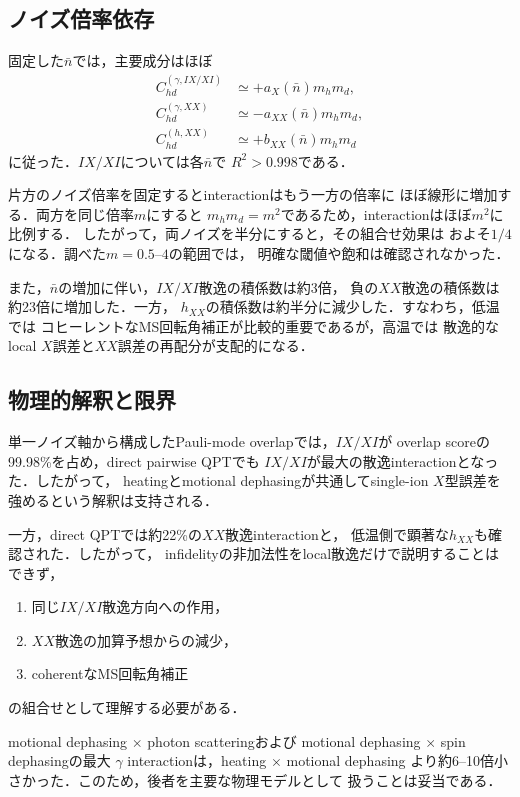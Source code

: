 \documentclass[dvipdfmx,a4paper,10pt,twocolumn]{jsarticle}
\begin{document}
\subsection{ノイズ倍率依存}

固定した$\bar n$では，主要成分はほぼ
\begin{align}
 C_{hd}^{(\gamma,IX/XI)}
 &\simeq +a_X(\bar n)m_hm_d,\\
 C_{hd}^{(\gamma,XX)}
 &\simeq -a_{XX}(\bar n)m_hm_d,\\
 C_{hd}^{(h,XX)}
 &\simeq +b_{XX}(\bar n)m_hm_d
\end{align}
に従った．$IX/XI$については各$\bar n$で
$R^2>0.998$である．

片方のノイズ倍率を固定するとinteractionはもう一方の倍率に
ほぼ線形に増加する．両方を同じ倍率$m$にすると
$m_hm_d=m^2$であるため，interactionはほぼ$m^2$に比例する．
したがって，両ノイズを半分にすると，その組合せ効果は
およそ$1/4$になる．調べた$m=0.5$--$4$の範囲では，
明確な閾値や飽和は確認されなかった．

また，$\bar n$の増加に伴い，$IX/XI$散逸の積係数は約3倍，
負の$XX$散逸の積係数は約23倍に増加した．一方，
$h_{XX}$の積係数は約半分に減少した．すなわち，低温では
コヒーレントなMS回転角補正が比較的重要であるが，高温では
散逸的なlocal $X$誤差と$XX$誤差の再配分が支配的になる．

\subsection{物理的解釈と限界}

単一ノイズ軸から構成したPauli-mode overlapでは，$IX/XI$が
overlap scoreの99.98\%を占め，direct pairwise QPTでも
$IX/XI$が最大の散逸interactionとなった．したがって，
heatingとmotional dephasingが共通してsingle-ion $X$型誤差を
強めるという解釈は支持される．

一方，direct QPTでは約22\%の$XX$散逸interactionと，
低温側で顕著な$h_{XX}$も確認された．したがって，
infidelityの非加法性をlocal散逸だけで説明することはできず，
\begin{enumerate}
 \item 同じ$IX/XI$散逸方向への作用，
 \item $XX$散逸の加算予想からの減少，
 \item coherentなMS回転角補正
\end{enumerate}
の組合せとして理解する必要がある．

motional dephasing $\times$ photon scatteringおよび
motional dephasing $\times$ spin dephasingの最大
$\gamma$ interactionは，heating $\times$ motional dephasing
より約6--10倍小さかった．このため，後者を主要な物理モデルとして
扱うことは妥当である．
\end{document}

